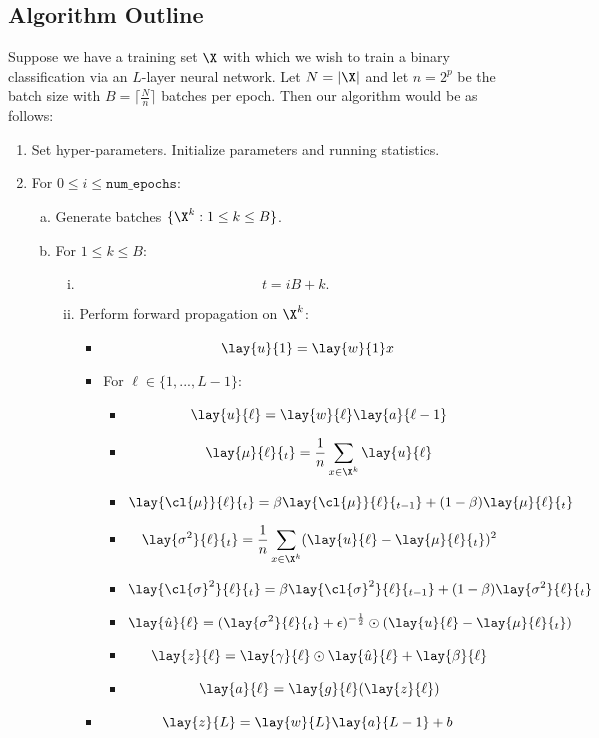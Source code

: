 \subsection{Algorithm Outline}
Suppose we have a training set $\X$ with which we wish to train a binary classification via an $L$-layer neural network.  Let $N=|\X|$ and let $n=2^p$ be the batch size with $B=\lceil\frac{N}{n}\rceil$ batches per epoch.  Then our algorithm would be as follows:
\begin{enumerate}[1.]
	\item Set hyper-parameters. Initialize parameters and running statistics.
	\item For $0\leq i\leq\texttt{num\_epochs}$:
	\begin{enumerate}[a.]
		\item Generate batches $\{\X^k:1\leq k\leq B\}$.
		\item For $1\leq k\leq B$:
		\begin{enumerate}[i.]
			\item $$t=iB + k.$$
			\item Perform forward propagation on $\X^k$:
			\begin{itemize}
				\item $$\lay{u}{1}=\lay{w}{1}x$$
				\item For $\ell\in\{1,...,L-1\}$:
				\begin{itemize}
					\item $$\lay{u}{\ell}=\lay{w}{\ell}\lay{a}{\ell-1}$$
					\item $$\lay{\mu}{\ell}{_t}=\frac{1}{n}\sum_{x\in\X^k}\lay{u}{\ell}$$
					\item $$\lay{\cl{\mu}}{\ell}{_t}=\beta\lay{\cl{\mu}}{\ell}{_{t-1}}+(1-\beta)\lay{\mu}{\ell}{_t}$$
					\item $$\lay{\sigma^2}{\ell}{_t}=\frac{1}{n}\sum_{x\in\X^k}(\lay{u}{\ell}-\lay{\mu}{\ell}{_t})^2$$
					\item $$\lay{\cl{\sigma}^2}{\ell}{_t}=\beta\lay{\cl{\sigma}^2}{\ell}{_{t-1}}+(1-\beta)\lay{\sigma^2}{\ell}{_t}$$
					\item $$\lay{\hat{u}}{\ell}=(\lay{\sigma^2}{\ell}{_t}+\epsilon)^{-\frac{1}{2}}\odot(\lay{u}{\ell}-\lay{\mu}{\ell}{_t})$$
					\item $$\lay{z}{\ell}=\lay{\gamma}{\ell}\odot\lay{\hat{u}}{\ell}+\lay{\beta}{\ell}$$
					\item $$\lay{a}{\ell}=\lay{g}{\ell}(\lay{z}{\ell})$$
				\end{itemize}
				\item $$\lay{z}{L}=\lay{w}{L}\lay{a}{L-1}+b$$

\end{itemize}
\end{enumerate}
\end{enumerate}
\end{enumerate}
